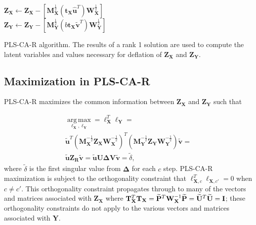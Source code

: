 \documentclass[12pt]{article}
\begin{document}
\begin{algorithm}
{  ${\mathbf Z}_{{\mathbf X}} \leftarrow {\mathbf Z}_{{\mathbf X}} - [{\mathbf M}_{\mathbf X}^{\frac{1}{2}}({\mathbf t}_{\mathbf X}\widehat{\mathbf u}^{T}){\mathbf W}_{\mathbf X}^{\frac{1}{2}}]$\\
  ${\mathbf Z}_{{\mathbf Y}} \leftarrow {\mathbf Z}_{{\mathbf Y}} - [{\mathbf M}_{\mathbf Y}^{\frac{1}{2}}(b{\mathbf t}_{\mathbf X}\widetilde{\mathbf{v}}^{T}){\mathbf W}_{\mathbf Y}^{\frac{1}{2}}]$
}
\caption{PLS-CA-R algorithm. The results of a rank 1 solution are used to compute the latent variables and values necessary for deflation of ${\mathbf Z}_{{\mathbf X}}$ and ${\mathbf Z}_{{\mathbf Y}}$.}
\label{algo:plscar}
\end{algorithm}

\hypertarget{maximization-in-pls-ca-r}{%
\subsection{Maximization in PLS-CA-R}\label{maximization-in-pls-ca-r}}

PLS-CA-R maximizes the common information between
\({\mathbf Z}_{\mathbf X}\) and \({\mathbf Z}_{\mathbf Y}\) such that

\begin{equation}
\begin{aligned}
\underset{{\boldsymbol \ell}_{\mathbf X},{\boldsymbol \ell}_{\mathbf Y}}{\operatorname{arg\,max}} = {\boldsymbol \ell}_{\mathbf X}^{T}{\boldsymbol \ell}_{\mathbf Y} = \\
\widetilde{\mathbf u}^{T}({\mathbf M}_{\mathbf X}^{-\frac{1}{2}}{\mathbf Z}_{\mathbf X}{\mathbf W}_{\mathbf X}^{-\frac{1}{2}})^{T}({\mathbf M}_{\mathbf Y}^{-\frac{1}{2}}{\mathbf Z}_{\mathbf Y}{\mathbf W}_{\mathbf Y}^{-\frac{1}{2}})\widetilde{\mathbf v} = \\
\widetilde{\mathbf u}{\mathbf Z}_{\mathbf R}\widetilde{\mathbf v} = \widetilde{\mathbf u}{\mathbf U}{\boldsymbol \Delta}{\mathbf V}\widetilde{\mathbf v}  = \widetilde\delta,
\end{aligned}
\end{equation} where \(\widetilde\delta\) is the first singular value
from \({\mathbf \Delta}\) for each \(c\) step. PLS-CA-R maximization is
subject to the orthogonality constraint that
\({\boldsymbol \ell}_{{\mathbf X},c}^{T}{\boldsymbol \ell}_{{\mathbf X},c'} = 0\)
when \(c \neq c'\). This orthogonality constraint propagates through to
many of the vectors and matrices associated with
\({\mathbf Z}_{\mathbf X}\) where
\({\mathbf T}_{\mathbf X}^{T}{\mathbf T}_{\mathbf X} = \widetilde{\mathbf P}^{T}{\mathbf W}_{\bf X}^{-1}\widetilde{\mathbf P} = \widetilde{\mathbf U}^{T}\widetilde{\mathbf U} = {\mathbf I}\);
these orthogonality constraints do not apply to the various vectors and
matrices associated with \({\mathbf Y}\).
\end{document}
